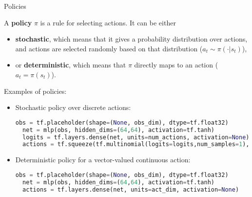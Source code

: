 \begin{frame}[fragile]{Policies}

A \textbf{policy} $\pi$ is a rule for selecting actions. It can be either
\begin{itemize}
\item \textbf{stochastic}, which means that it gives a probability distribution over actions, and actions are selected randomly based on that distribution ($a_t \sim \pi(\cdot|s_t)$),
\item or \textbf{deterministic}, which means that $\pi$ directly maps to an action ($a_t = \pi(s_t)$). 
\end{itemize}

\pause


\lstset{style=mystyle}

Examples of policies:
%
\begin{itemize}
\item Stochastic policy over discrete actions:
\begin{lstlisting}[language=python]
  obs = tf.placeholder(shape=(None, obs_dim), dtype=tf.float32)
  net = mlp(obs, hidden_dims=(64,64), activation=tf.tanh)
  logits = tf.layers.dense(net, units=num_actions, activation=None)
  actions = tf.squeeze(tf.multinomial(logits=logits,num_samples=1), axis=1)
\end{lstlisting}
\item Deterministic policy for a vector-valued continuous action:
\begin{lstlisting}[language=python]
  obs = tf.placeholder(shape=(None, obs_dim), dtype=tf.float32)
  net = mlp(obs, hidden_dims=(64,64), activation=tf.tanh)
  actions = tf.layers.dense(net, units=act_dim, activation=None)
\end{lstlisting}

\end{itemize}

\lstset{style=mystyle3}

\end{frame}


